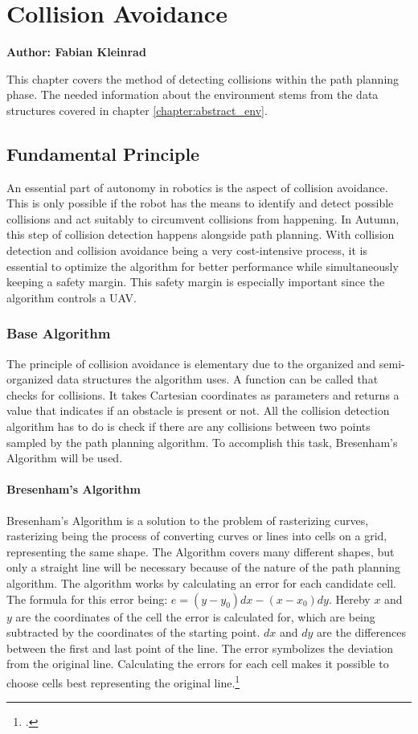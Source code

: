 \chapter{Collision Avoidance}
\label{chapter:collision_detection}

\textbf{Author: Fabian Kleinrad} 

This chapter covers the method of detecting collisions within the path planning phase. The needed information about the environment stems from the data structures covered in chapter \ref{chapter:abstract_env}. 

\section{Fundamental Principle}
An essential part of autonomy in robotics is the aspect of collision avoidance. This is only possible if the robot has the means to identify and detect possible collisions and act suitably to circumvent collisions from happening.\newline
In Autumn, this step of collision detection happens alongside path planning. With collision detection and collision avoidance being a very cost-intensive process, it is essential to optimize the algorithm for better performance while simultaneously keeping a safety margin. This safety margin is especially important since the algorithm controls a UAV. 

\subsection{Base Algorithm}
The principle of collision avoidance is elementary due to the organized and semi-organized data structures the algorithm uses. A function can be called that checks for collisions. It takes Cartesian coordinates as parameters and returns a value that indicates if an obstacle is present or not. All the collision detection algorithm has to do is check if there are any collisions between two points sampled by the path planning algorithm. To accomplish this task, Bresenham's Algorithm will be used.\newline

\subsubsection{Bresenham's Algorithm} 
Bresenham's Algorithm is a solution to the problem of rasterizing curves, rasterizing being the process of converting curves or lines into cells on a grid, representing the same shape. The Algorithm covers many different shapes, but only a straight line will be necessary because of the nature of the path planning algorithm.
The algorithm works by calculating an error for each candidate cell. The formula for this error being: $e=(y-y_0)dx-(x-x_0)dy$. Hereby $x$ and $y$ are the coordinates of the cell the error is calculated for, which are being subtracted by the coordinates of the starting point. $dx$ and $dy$ are the differences between the first and last point of the line.
The error symbolizes the deviation from the original line. Calculating the errors for each cell makes it possible to choose cells best representing the original line.\footcite{Zingl2012}

